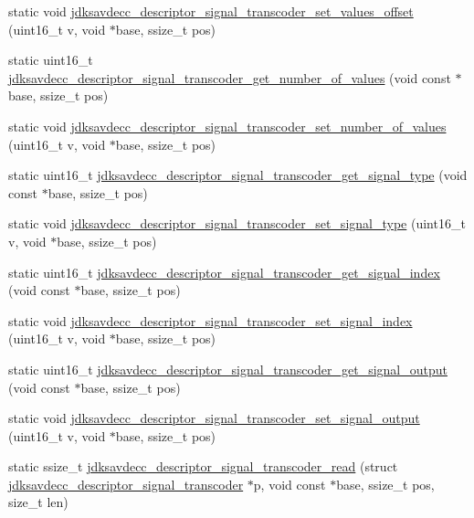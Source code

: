 \begin{DoxyCompactItemize}
\item 
static void \hyperlink{group__descriptor__transcoder_gaafdad525bb50c88f8b2458da77e8b494}{jdksavdecc\+\_\+descriptor\+\_\+signal\+\_\+transcoder\+\_\+set\+\_\+values\+\_\+offset} (uint16\+\_\+t v, void $\ast$base, ssize\+\_\+t pos)
\item 
static uint16\+\_\+t \hyperlink{group__descriptor__transcoder_ga57f0e1c8f9e771dd5cc99ee660abf670}{jdksavdecc\+\_\+descriptor\+\_\+signal\+\_\+transcoder\+\_\+get\+\_\+number\+\_\+of\+\_\+values} (void const $\ast$base, ssize\+\_\+t pos)
\item 
static void \hyperlink{group__descriptor__transcoder_ga82080622534169e1d12393fa48a33144}{jdksavdecc\+\_\+descriptor\+\_\+signal\+\_\+transcoder\+\_\+set\+\_\+number\+\_\+of\+\_\+values} (uint16\+\_\+t v, void $\ast$base, ssize\+\_\+t pos)
\item 
static uint16\+\_\+t \hyperlink{group__descriptor__transcoder_ga359342278faa6eb536dae43591fe9d27}{jdksavdecc\+\_\+descriptor\+\_\+signal\+\_\+transcoder\+\_\+get\+\_\+signal\+\_\+type} (void const $\ast$base, ssize\+\_\+t pos)
\item 
static void \hyperlink{group__descriptor__transcoder_ga874b1fc40a31a461420da305b1fb9891}{jdksavdecc\+\_\+descriptor\+\_\+signal\+\_\+transcoder\+\_\+set\+\_\+signal\+\_\+type} (uint16\+\_\+t v, void $\ast$base, ssize\+\_\+t pos)
\item 
static uint16\+\_\+t \hyperlink{group__descriptor__transcoder_ga505f5283e70c9d181e14cff0a1b18c6d}{jdksavdecc\+\_\+descriptor\+\_\+signal\+\_\+transcoder\+\_\+get\+\_\+signal\+\_\+index} (void const $\ast$base, ssize\+\_\+t pos)
\item 
static void \hyperlink{group__descriptor__transcoder_ga428536a59991110555fd673e39e1293f}{jdksavdecc\+\_\+descriptor\+\_\+signal\+\_\+transcoder\+\_\+set\+\_\+signal\+\_\+index} (uint16\+\_\+t v, void $\ast$base, ssize\+\_\+t pos)
\item 
static uint16\+\_\+t \hyperlink{group__descriptor__transcoder_ga0f09af6fb05518183a3152970f1a6496}{jdksavdecc\+\_\+descriptor\+\_\+signal\+\_\+transcoder\+\_\+get\+\_\+signal\+\_\+output} (void const $\ast$base, ssize\+\_\+t pos)
\item 
static void \hyperlink{group__descriptor__transcoder_gab2aea88bd4e0fe9467fc74e3a4454fd1}{jdksavdecc\+\_\+descriptor\+\_\+signal\+\_\+transcoder\+\_\+set\+\_\+signal\+\_\+output} (uint16\+\_\+t v, void $\ast$base, ssize\+\_\+t pos)
\item 
static ssize\+\_\+t \hyperlink{group__descriptor__transcoder_gaded4be4265deb4c8bd20a6a99a42b81e}{jdksavdecc\+\_\+descriptor\+\_\+signal\+\_\+transcoder\+\_\+read} (struct \hyperlink{structjdksavdecc__descriptor__signal__transcoder}{jdksavdecc\+\_\+descriptor\+\_\+signal\+\_\+transcoder} $\ast$p, void const $\ast$base, ssize\+\_\+t pos, size\+\_\+t len)

\end{DoxyCompactItemize}
